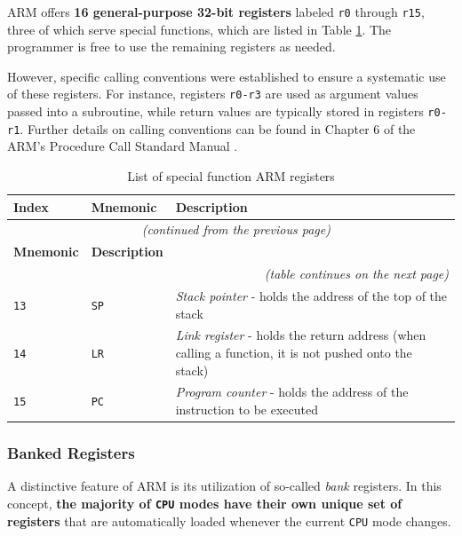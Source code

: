\documentclass[english, ing, kiv, he, iso690numb, pdf]{fasthesis}
\begin{document}
	ARM offers \textbf{16 general-purpose 32-bit registers} labeled \texttt{r0} through \texttt{r15}, three of which serve special functions, which are listed in Table \ref{List of special function ARM registers}. The programmer is free to use the remaining registers as needed.
	
	However, specific calling conventions were established to ensure a systematic use of these registers. For instance, registers \texttt{r0-r3} are used as argument values passed into a subroutine, while return values are typically stored in registers \texttt{r0-r1}. Further details on calling conventions can be found in Chapter 6 of the ARM's Procedure Call Standard Manual \cite{ARM-calling-conventions}.
	
	\begin{center}
		\begin{longtable}{p{}p{}p{}}
			\caption{List of special function ARM registers}
			\label{List of special function ARM registers}\\
			\toprule[1.5pt]
			\textbf{Index} & \textbf{Mnemonic} & \textbf{Description}\\
			\midrule
			\endfirsthead
			\multicolumn{3}{c}{\tablename{}~\thetable{} \textit{(continued from the previous page)}}\\
			\midrule
			\textbf{Mnemonic} & \textbf{Description}\\
			\midrule
			\endhead
			\midrule
			\multicolumn{3}{r}{\textit{(table continues on the next page)}}\\
			\endfoot
			\bottomrule[1.5pt]
			\endlastfoot
			\texttt{13} & \texttt{SP} & \textit{Stack pointer} - holds the address of the top of the stack \\
			\texttt{14} & \texttt{LR} & \textit{Link register} - holds the return address (when calling a function, it is not pushed onto the stack)\\ 
			\texttt{15} & \texttt{PC} & \textit{Program counter} - holds the address of the instruction to be executed \\
		\end{longtable}
	\end{center}
	
	\subsubsection{Banked Registers} \label{section-banked-registers}
	
	A distinctive feature of ARM is its utilization of so-called \textit{bank} registers. In this concept, \textbf{the majority of \texttt{CPU} modes have their own unique set of registers} that are automatically loaded whenever the current \texttt{CPU} mode changes.
	
\end{document}
